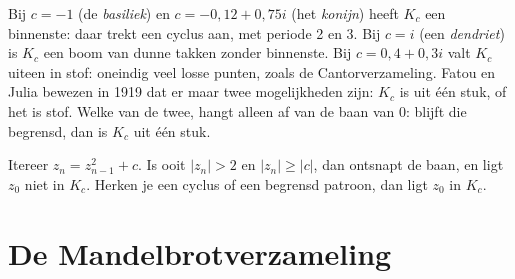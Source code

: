 Bij $c = -1$ (de \textit{basiliek}) en $c = -0{,}12 + 0{,}75i$ (het \textit{konijn}) heeft $K_c$ een binnenste: daar trekt een cyclus aan, met periode 2 en 3. Bij $c = i$ (een \textit{dendriet}) is $K_c$ een boom van dunne takken zonder binnenste. Bij $c = 0{,}4 + 0{,}3i$ valt $K_c$ uiteen in stof: oneindig veel losse punten, zoals de Cantorverzameling. Fatou en Julia bewezen in 1919 dat er maar twee mogelijkheden zijn: $K_c$ is uit één stuk, of het is stof. Welke van de twee, hangt alleen af van de baan van 0: blijft die begrensd, dan is $K_c$ uit één stuk.


\begin{werkwijze}
Itereer $z_n = z_{n-1}^2 + c$. Is ooit $|z_n| > 2$ en $|z_n| \geqslant |c|$, dan ontsnapt de baan, en ligt $z_0$ niet in $K_c$. Herken je een cyclus of een begrensd patroon, dan ligt $z_0$ in $K_c$.
\end{werkwijze}


\begin{oefeningen}

\end{oefeningen}

\section{De Mandelbrotverzameling}

